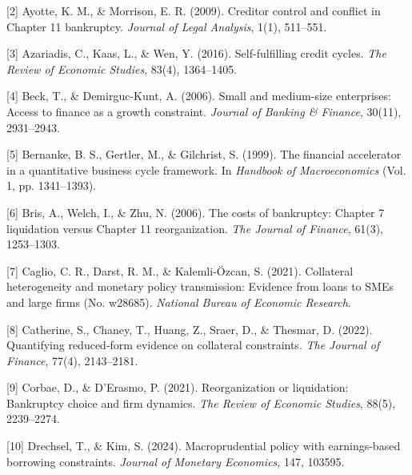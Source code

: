 \documentclass[12pt]{article}
\begin{document}
\noindent
\hangindent=0.7cm
[2] Ayotte, K. M., \& Morrison, E. R. (2009). Creditor control and conflict in Chapter 11 bankruptcy. \textit{Journal of Legal Analysis}, 1(1), 511--551.
\vspace{3mm}

\noindent
\hangindent=0.7cm
[3] Azariadis, C., Kaas, L., \& Wen, Y. (2016). Self-fulfilling credit cycles. \textit{The Review of Economic Studies}, 83(4), 1364--1405.
\vspace{3mm}

\noindent
\hangindent=0.7cm
[4] Beck, T., \& Demirguc-Kunt, A. (2006). Small and medium-size enterprises: Access to finance as a growth constraint. \textit{Journal of Banking \& Finance}, 30(11), 2931--2943.
\vspace{3mm}

\noindent
\hangindent=0.7cm
[5] Bernanke, B. S., Gertler, M., \& Gilchrist, S. (1999). The financial accelerator in a quantitative business cycle framework. In \textit{Handbook of Macroeconomics} (Vol. 1, pp. 1341--1393).
\vspace{3mm}

\noindent
\hangindent=0.7cm
[6] Bris, A., Welch, I., \& Zhu, N. (2006). The costs of bankruptcy: Chapter 7 liquidation versus Chapter 11 reorganization. \textit{The Journal of Finance}, 61(3), 1253--1303.
\vspace{3mm}

\noindent
\hangindent=0.7cm
[7] Caglio, C. R., Darst, R. M., \& Kalemli-Özcan, S. (2021). Collateral heterogeneity and monetary policy transmission: Evidence from loans to SMEs and large firms (No. w28685). \textit{National Bureau of Economic Research}.
\vspace{3mm}

\noindent
\hangindent=0.7cm
[8] Catherine, S., Chaney, T., Huang, Z., Sraer, D., \& Thesmar, D. (2022). Quantifying reduced‐form evidence on collateral constraints. \textit{The Journal of Finance}, 77(4), 2143--2181.
\vspace{3mm}

\noindent
\hangindent=0.7cm
[9] Corbae, D., \& D'Erasmo, P. (2021). Reorganization or liquidation: Bankruptcy choice and firm dynamics. \textit{The Review of Economic Studies}, 88(5), 2239--2274.
\vspace{3mm}

\noindent
\hangindent=0.7cm
[10] Drechsel, T., \& Kim, S. (2024). Macroprudential policy with earnings-based borrowing constraints. \textit{Journal of Monetary Economics}, 147, 103595.
\vspace{3mm}
\end{document}
